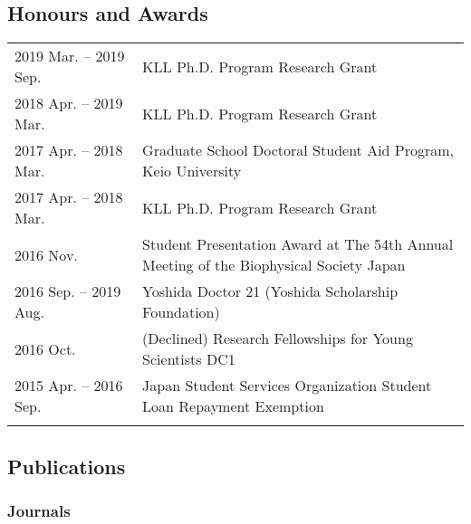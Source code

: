 \documentclass[12pt,]{scrartcl}
\begin{document}
\subsection{Honours and
Awards}\label{selected-honours-and-awards}

\begin{table}[!h]
{\def\arraystretch{1.5}\tabcolsep=0pt
\begin{tabular}{p{0.28\linewidth}p{0.75\linewidth}}
    2019 Mar. -- 2019 Sep. & KLL Ph.D. Program Research Grant\\
    2018 Apr. -- 2019 Mar. & KLL Ph.D. Program Research Grant\\
    2017 Apr. -- 2018 Mar. & Graduate School Doctoral Student Aid Program, Keio University\\
    2017 Apr. -- 2018 Mar. & KLL Ph.D. Program Research Grant\\
    2016 Nov. & Student Presentation Award at The 54th Annual Meeting of the Biophysical Society Japan\\
    2016 Sep. -- 2019 Aug. & Yoshida Doctor 21 (Yoshida Scholarship Foundation)\\
    2016 Oct. & (Declined) Research Fellowships for Young Scientists DC1\\
    2015 Apr. -- 2016 Sep. & Japan Student Services Organization Student Loan Repayment Exemption\\
\\
\end{tabular}%
}
\end{table}

\subsection{Publications}\label{publications}
\subsubsection{Journals}\label{journals}
\end{document}
